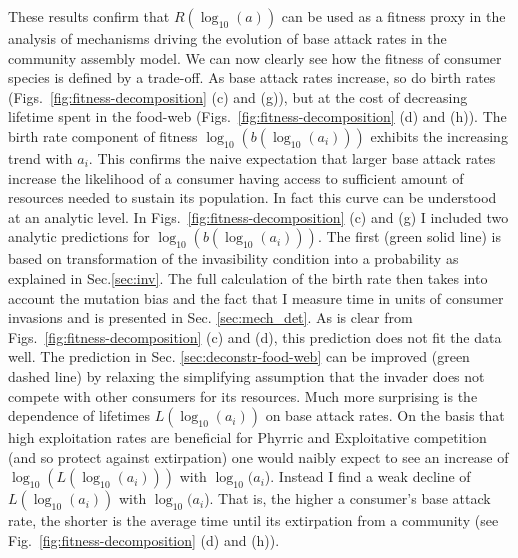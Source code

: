 \documentclass[a4paper]{report}
\DeclareMathOperator{\log}{log}
\begin{document}
These results confirm that $R(\log_{10}(a))$ can be used as a fitness proxy in the analysis of mechanisms driving the evolution of base attack rates in the community assembly model. We can now clearly see how the fitness of consumer species is defined by a trade-off. As base attack rates increase, so do birth rates (Figs.~\ref{fig:fitness-decomposition} (c) and (g)), but at the cost of decreasing lifetime spent in the food-web (Figs.~\ref{fig:fitness-decomposition} (d) and (h)). The birth rate component of fitness $\log_{10}(b(\log_{10}(a_i)))$ exhibits the increasing
trend with $a_i$. This confirms the naive expectation that larger base attack rates increase the likelihood of a consumer having access to sufficient amount of
resources needed to sustain its population. In fact this
curve can be understood at an analytic level. In
Figs.~\ref{fig:fitness-decomposition} (c) and (g) I included two analytic predictions for
$\log_{10}(b(\log_{10}(a_i)))$. The first (green solid line) is based on transformation of the
invasibility condition into a probability as explained in Sec.\ref{sec:inv}. The full calculation of the birth rate then takes into account the mutation bias and the fact that I measure time in units
of consumer invasions and is presented in Sec. \ref{sec:mech_det}. As is clear from
Figs.~\ref{fig:fitness-decomposition} (c) and (d), this prediction does not fit
the data well. The prediction in Sec. \ref{sec:deconstr-food-web} can be improved (green dashed line) by relaxing
the simplifying assumption that the invader does not compete with
other consumers for its resources. Much more surprising is the dependence of lifetimes $L(\log_{10}(a_i))$ on base
attack rates. On the basis
that high exploitation rates are beneficial for Phyrric and Exploitative competition (and so protect against extirpation) one would naibly expect to see an increase of $\log_{10}(L(\log_{10}(a_i)))$ with
$\log_{10}(a_i$). Instead I find a weak decline
of $L(\log_{10}(a_i))$ with $\log_{10}(a_i$). That is, the higher a consumer's base attack rate, the
shorter is the average time until its extirpation from a community
(see Fig.~\ref{fig:fitness-decomposition} (d) and (h)). \\
\end{document}
